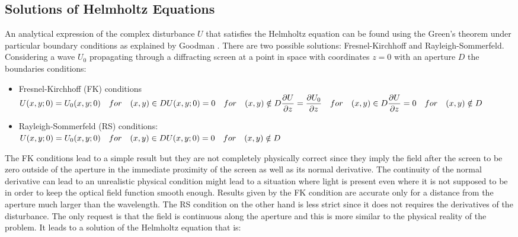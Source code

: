 \subsection{Solutions of Helmholtz Equations}
 An analytical expression of the complex disturbance $U$ that satisfies the Helmholtz equation can be found using the Green's theorem under particular boundary conditions as explained by Goodman \cite{goodman2005introduction}. There are two possible solutions: Fresnel-Kirchhoff and Rayleigh-Sommerfeld.
Considering a wave $U_0$ propagating through a diffracting screen at a point in space with coordinates $z=0$ with an aperture $D$ the boundaries conditions:
\begin{itemize}
	\item Fresnel-Kirchhoff (FK) conditions \\
	\begin{math}
		\label{eq:FKbound}
		U(x,y;0)=U_0(x,y;0) \quad for \quad (x,y)\in D\\
		U(x,y;0)=0 \quad for \quad (x,y)\notin D\\
		\\
		\dfrac{\partial U}{\partial z}=\dfrac{\partial U_0}{\partial z} \quad for \quad (x,y)\in D\\
		\\
		\dfrac{\partial U}{\partial z}=0 \quad for \quad (x,y)\notin D\\	
		\end{math}
	\item Rayleigh-Sommerfeld (RS) conditions:\\
	\begin{math}
	U(x,y;0)=U_0(x,y;0) \quad for \quad (x,y)\in D\\
	U(x,y;0)=0 \quad for \quad (x,y)\notin D\\
	\end{math}
\end{itemize}
	The FK conditions lead to a simple result but they are not completely physically correct since they imply the field after the screen to be zero outside of the aperture in the immediate proximity of the screen as well as its normal derivative. The continuity of the normal derivative can lead to an unrealistic physical condition might lead to a situation where light is present even where it is not supposed to be in order to keep the optical field function smooth enough. Results given by the FK condition are accurate only for a distance from the aperture much larger than the wavelength.
	The RS condition on the other hand is less strict since it does not requires the derivatives of the disturbance. The only request is that the field is continuous along the aperture and this is more similar to the physical reality of the problem. It leads to a solution of the Helmholtz equation that is:
